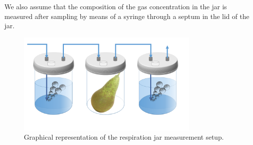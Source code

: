 {\color{red}We also assume that the composition of the gas concentration in the jar is measured after sampling by means of a syringe through a septum in the lid of the jar.}
\begin{figure}
	\centering
	\includegraphics[width=0.8\textwidth]{figure/paper 1/pot.png}
	\caption{Graphical representation of the respiration jar measurement setup.}
	\label{figJar}
\end{figure}
